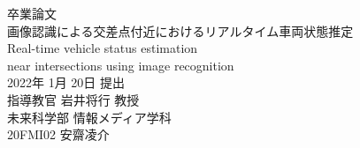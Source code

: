 \thispagestyle{empty}
\begin{center}
\vspace*{-1cm}
\Huge{卒業論文}\\
\vspace{1cm}
\LARGE{画像認識による交差点付近におけるリアルタイム車両状態推定}\\
\vspace{0.2cm}
\large{Real-time vehicle status estimation \\ near intersections using image recognition}\\
\vspace{2cm}
\Large{2022年 1月 20日 提出}\\
\vspace{2cm}
\LARGE{指導教官 岩井将行 教授}\\
\vspace{1cm}
\LARGE{未来科学部 情報メディア学科}\\
\vspace{1cm}
\huge{20FMI02 安齋凌介}\\
\end{center}
